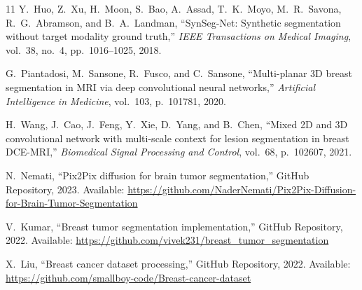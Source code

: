 \documentclass[10pt,journal,compsoc]{IEEEtran}
\begin{document}
\begin{thebibliography}{11}
Y.~Huo, Z.~Xu, H.~Moon, S.~Bao, A.~Assad, T.~K.~Moyo, M.~R.~Savona, R.~G.~Abramson, and B.~A.~Landman,
``SynSeg-Net: Synthetic segmentation without target modality ground truth,''
\emph{IEEE Transactions on Medical Imaging},
vol.~38, no.~4, pp.~1016--1025, 2018.

G.~Piantadosi, M.~Sansone, R.~Fusco, and C.~Sansone,
``Multi-planar 3D breast segmentation in MRI via deep convolutional neural networks,''
\emph{Artificial Intelligence in Medicine},
vol.~103, p.~101781, 2020.

H.~Wang, J.~Cao, J.~Feng, Y.~Xie, D.~Yang, and B.~Chen,
``Mixed 2D and 3D convolutional network with multi-scale context for lesion segmentation in breast DCE-MRI,''
\emph{Biomedical Signal Processing and Control},
vol.~68, p.~102607, 2021.

N.~Nemati,
``Pix2Pix diffusion for brain tumor segmentation,''
GitHub Repository, 2023. Available: \url{https://github.com/NaderNemati/Pix2Pix-Diffusion-for-Brain-Tumor-Segmentation}

V.~Kumar,
``Breast tumor segmentation implementation,''
GitHub Repository, 2022. Available: \url{https://github.com/vivek231/breast_tumor_segmentation}

X.~Liu,
``Breast cancer dataset processing,''
GitHub Repository, 2022. Available: \url{https://github.com/smallboy-code/Breast-cancer-dataset}

\end{thebibliography}
\end{document}
